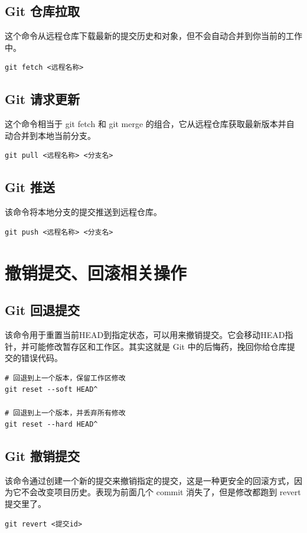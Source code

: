 \documentclass[UTF8]{gyh}
\begin{document}
    \subsection{Git 仓库拉取}
    这个命令从远程仓库下载最新的提交历史和对象，但不会自动合并到你当前的工作中。
    \begin{lstlisting}
git fetch <远程名称>
    \end{lstlisting}

    \subsection{Git 请求更新}
    这个命令相当于 git fetch 和 git merge 的组合，它从远程仓库获取最新版本并自动合并到本地当前分支。
    \begin{lstlisting}
git pull <远程名称> <分支名>
    \end{lstlisting}

    \subsection{Git 推送}
    该命令将本地分支的提交推送到远程仓库。
    \begin{lstlisting}
git push <远程名称> <分支名>
    \end{lstlisting}

    \section{撤销提交、回滚相关操作}

    \subsection{Git 回退提交}
    该命令用于重置当前HEAD到指定状态，可以用来撤销提交。它会移动HEAD指针，并可能修改暂存区和工作区。其实这就是 Git 中的后悔药，挽回你给仓库提交的错误代码。
    \begin{lstlisting}
# 回退到上一个版本，保留工作区修改
git reset --soft HEAD^

# 回退到上一个版本，并丢弃所有修改
git reset --hard HEAD^
    \end{lstlisting}

    \subsection{Git 撤销提交}
    该命令通过创建一个新的提交来撤销指定的提交，这是一种更安全的回滚方式，因为它不会改变项目历史。表现为前面几个 commit 消失了，但是修改都跑到 revert 提交里了。
    \begin{lstlisting}
git revert <提交id>
    \end{lstlisting}
\end{document}
